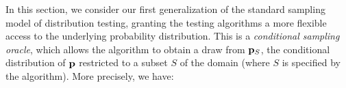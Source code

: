 %


In this section, we consider our first generalization of the standard sampling model of distribution testing, granting the testing algorithms a more flexible access to the underlying probability distribution. This is a \emph{conditional sampling oracle}, which
allows the algorithm to obtain a draw from $\mathbf{p}_S$, the conditional distribution of $\mathbf{p}$
restricted to a subset $S$ of the domain (where $S$ is specified by the algorithm).  More
precisely, we have:

